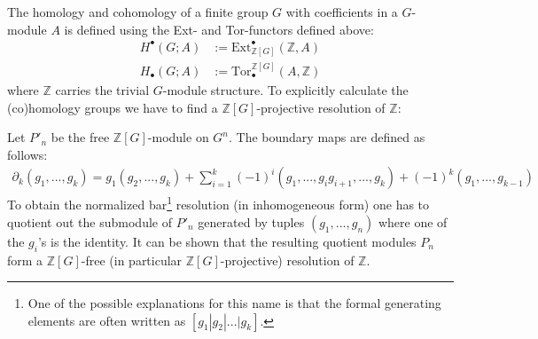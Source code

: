 	The homology and cohomology of a finite group $G$ with coefficients in a $G$-module $A$ is defined using the Ext- and Tor-functors defined above:
	\begin{align}
		H^\bullet(G; A) &:= \text{Ext}_{\mathbb{Z}[G]}^\bullet(\mathbb{Z}, A)\\
		H_\bullet(G; A) &:= \text{Tor}^{\mathbb{Z}[G]}_\bullet(A, \mathbb{Z})
	\end{align}
	where $\mathbb{Z}$ carries the trivial $G$-module structure. To explicitly calculate the (co)homology groups we have to find a $\mathbb{Z}[G]$-projective resolution of $\mathbb{Z}$:
	\begin{construct}
		Let $P'_n$ be the free $\mathbb{Z}[G]$-module on $G^n$. The boundary maps are defined as follows:
		\begin{gather}
			\label{hom_group_boundary}
			\partial_k(g_1, ..., g_k) = g_1(g_2, ..., g_k) + \sum_{i=1}^k (-1)^i(g_1, ..., g_ig_{i+1}, ..., g_k) + (-1)^k (g_1, ..., g_{k-1})
		\end{gather}
		To obtain the normalized bar\footnote{One of the possible explanations for this name is that the formal generating elements are often written as $[g_1|g_2|...|g_k]$.} resolution (in inhomogeneous form) one has to quotient out the submodule of $P'_n$ generated by tuples $(g_1,..., g_n)$ where one of the $g_i$'s is the identity. It can be shown that the resulting quotient modules $P_n$ form a $\mathbb{Z}[G]$-free (in particular $\mathbb{Z}[G]$-projective) resolution of $\mathbb{Z}$.
	\end{construct}
	
